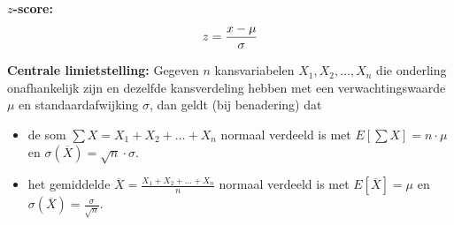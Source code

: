 \documentclass[11pt,a4paper,dutch]{article} %
\begin{document}

\textbf{$z$-score:}
\[
    z = \frac{x - \mu}{\sigma}\\
\]

\textbf{Centrale limietstelling:}
Gegeven $n$ kansvariabelen $X_1, X_2, \ldots, X_n$ die onderling onafhankelijk zijn en dezelfde kansverdeling hebben met een verwachtingswaarde $\mu$ en standaardafwijking $\sigma$, dan geldt (bij benadering) dat
\begin{itemize}
    \item de som $\sum X = X_1 + X_2 + \ldots + X_n$ normaal verdeeld is met $E[\sum X] = n \cdot \mu$ en $\sigma(\overline{X}) = \sqrt{n} \cdot \sigma$.
    \item het gemiddelde $\overline{X} = \frac{X_1 + X_2 + \ldots + X_n}{n}$ normaal verdeeld is met $E[\overline{X}]=\mu$ en $\sigma(\overline{X})=\frac{\sigma}{\sqrt{n}}$.
\end{itemize}



\end{document}
